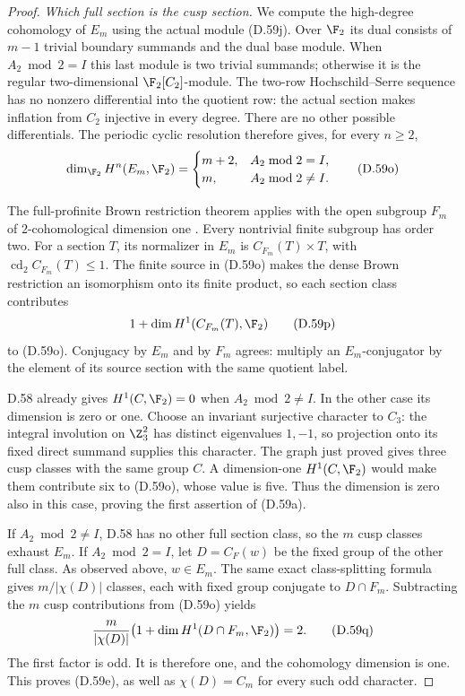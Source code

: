 \begin{proof}
\emph{Which full section is the cusp section.}
We compute the high-degree cohomology of $E_m$
using the actual module (D.59j).
Over $\F_2$ its dual consists of $m-1$ trivial
boundary summands and the dual base module.
When $A_2\bmod2=I$ this last module is two
trivial summands; otherwise it is the regular
two-dimensional $\F_2[C_2]$-module.
The two-row Hochschild--Serre sequence has no
nonzero differential into the quotient row:
the actual section makes inflation from $C_2$
injective in every degree. There are no other
possible differentials.
The periodic cyclic resolution therefore gives,
for every $n\geq2$,
\[
 \dim_{\F_2}H^n(E_m,\F_2)=
 \begin{cases}
   m+2,&A_2\bmod2=I,\\
   m,&A_2\bmod2\ne I.
 \end{cases}                                           \tag{D.59o}
\]

The full-profinite Brown restriction theorem
applies with the open subgroup $F_m$ of
$2$-cohomological dimension one
\cite[Theorem~2 and \S1.1]{A-KochloukovaZalesskii2007}.
Every nontrivial finite subgroup has order two.
For a section $T$, its normalizer in $E_m$ is
$C_{F_m}(T)\times T$, with
$\operatorname{cd}_2C_{F_m}(T)\leq1$.
The finite source in (D.59o) makes the dense
Brown restriction an isomorphism onto its
finite product, so each section class contributes
\[
                     1+\dim H^1(C_{F_m}(T),\F_2)
                                                        \tag{D.59p}
\]
to (D.59o).
Conjugacy by $E_m$ and by $F_m$ agrees: multiply
an $E_m$-conjugator by the element of its source
section with the same quotient label.

D.58 already gives $H^1(C,\F_2)=0$ when
$A_2\bmod2\ne I$.
In the other case its dimension is zero or one.
Choose an invariant surjective character to
$C_3$: the integral involution on $\Z_3^2$ has
distinct eigenvalues $1,-1$, so projection onto
its fixed direct summand supplies this character.
The graph just proved gives three cusp classes
with the same group $C$. A dimension-one $H^1(C,\F_2)$
would make them contribute six to (D.59o),
whose value is five. Thus the dimension is zero
also in this case, proving the first assertion
of (D.59a).

If $A_2\bmod2\ne I$, D.58 has no other full
section class, so the $m$ cusp classes exhaust
$E_m$. If $A_2\bmod2=I$, let $D=C_F(w)$ be the
fixed group of the other full class.
As observed above, $w\in E_m$.
The same exact class-splitting formula gives
$m/|\chi(D)|$ classes, each with fixed group
conjugate to $D\cap F_m$. Subtracting the $m$
cusp contributions from (D.59o) yields
\[
 \frac{m}{|\chi(D)|}
       \bigl(1+\dim H^1(D\cap F_m,\F_2)\bigr)=2 .
                                                        \tag{D.59q}
\]
The first factor is odd. It is therefore one,
and the cohomology dimension is one.
This proves (D.59e), as well as
$\chi(D)=C_m$ for every such odd character.


\end{proof}
